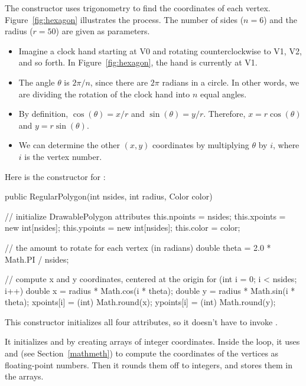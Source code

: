 The constructor uses trigonometry to find the coordinates of each vertex.
Figure~\ref{fig:hexagon} illustrates the process.
The number of sides ($n=6$) and the radius ($r=50$) are given as parameters.

\begin{itemize}

\item Imagine a clock hand starting at V0 and rotating counterclockwise to V1, V2, and so forth.
In Figure~\ref{fig:hexagon}, the hand is currently at V1.

\item The angle $\theta$ is $2 \pi / n$, since there are $2\pi$ radians in a circle.
In other words, we are dividing the rotation of the clock hand into $n$ equal angles.

\item By definition, $\cos(\theta) = x/r$ and $\sin(\theta) = y/r$.
Therefore, $x = r \cos(\theta)$ and $y = r \sin(\theta)$.

\item We can determine the other $(x, y)$ coordinates by multiplying $\theta$ by $i$, where $i$ is the vertex number.

\end{itemize}

Here is the constructor for :

\begin{code}
public RegularPolygon(int nsides, int radius, Color color) {

    // initialize DrawablePolygon attributes
    this.npoints = nsides;
    this.xpoints = new int[nsides];
    this.ypoints = new int[nsides];
    this.color = color;

    // the amount to rotate for each vertex (in radians)
    double theta = 2.0 * Math.PI / nsides;

    // compute x and y coordinates, centered at the origin
    for (int i = 0; i < nsides; i++) {
        double x = radius * Math.cos(i * theta);
        double y = radius * Math.sin(i * theta);
        xpoints[i] = (int) Math.round(x);
        ypoints[i] = (int) Math.round(y);
    }
}
\end{code}

This constructor initializes all four  attributes, so it doesn't have to invoke .

It initializes  and  by creating arrays of integer coordinates.
Inside the  loop, it uses  and  (see Section~\ref{mathmeth}) to compute the coordinates of the vertices as floating-point numbers.
Then it rounds them off to integers, and stores them in the arrays.

